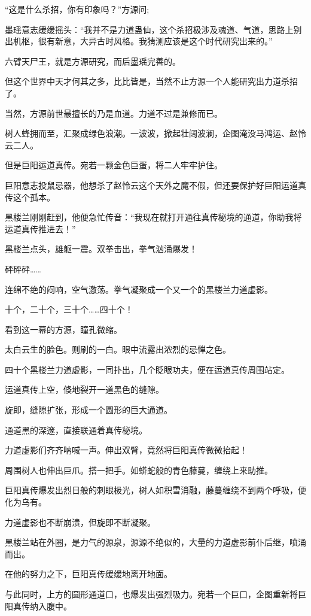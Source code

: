 \begin{this_body}
“这是什么杀招，你有印象吗？”方源问;

墨瑶意志缓缓摇头：“我并不是力道蛊仙，这个杀招极涉及魂道、气道，思路上别出机枢，很有新意，大异古时风格。我猜测应该是这个时代研究出来的。”

六臂天尸王，就是方源研究，而后墨瑶完善的。

但这个世界中天才何其之多，比比皆是，当然不止方源一个人能研究出力道杀招了。

当然，方源前世最擅长的乃是血道。力道不过是兼修而已。

树人蜂拥而至，汇聚成绿色浪潮。一波波，掀起壮阔波澜，企图淹没马鸿运、赵怜云二人。

但是巨阳运道真传。宛若一颗金色巨蛋，将二人牢牢护住。

巨阳意志投鼠忌器，他想杀了赵怜云这个天外之魔不假，但还要保护好巨阳运道真传这个孤本。

黑楼兰刚刚赶到，他便急忙传音：“我现在就打开通往真传秘境的通道，你助我将运道真传推进去！”

黑楼兰点头，雄躯一震。双拳击出，拳气汹涌爆发！

砰砰砰……

连绵不绝的闷响，空气激荡。拳气凝聚成一个又一个的黑楼兰力道虚影。

十个，二十个，三十个……四十个！

看到这一幕的方源，瞳孔微缩。

太白云生的脸色。则刷的一白。眼中流露出浓烈的忌惮之色。

四十个黑楼兰力道虚影，一同扑出，几个眨眼功夫，便在运道真传周围站定。

运道真传上空，倏地裂开一道黑色的缝隙。

旋即，缝隙扩张，形成一个圆形的巨大通道。

通道黑的深邃，直接联通着真传秘境。

力道虚影们齐齐呐喊一声。伸出双臂，竟然将巨阳真传微微抬起！

周围树人也伸出巨爪。搭一把手。如蟒蛇般的青色藤蔓，缠绕上来助推。

巨阳真传爆发出烈日般的刺眼极光，树人如积雪消融，藤蔓缠绕不到两个呼吸，便化为乌有。

力道虚影也不断崩溃，但旋即不断凝聚。

黑楼兰站在外圈，是力气的源泉，源源不绝似的，大量的力道虚影前仆后继，喷涌而出。

在他的努力之下，巨阳真传缓缓地离开地面。

与此同时，上方的圆形通道口，也爆发出强烈吸力。宛若一个巨口，企图重新将巨阳真传纳入腹中。


\end{this_body}
